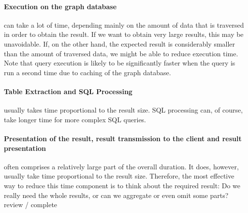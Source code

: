 \paragraph{Execution on the graph database} can take a lot of time, depending mainly on the amount of data that is traversed in order to obtain the result.
If we want to obtain very large results, this may be unavoidable.
If, on the other hand, the expected result is considerably smaller than the amount of traversed data, we might be able to reduce execution time.
Note that query execution is likely to be significantly faster when the query is run a second time due to caching of the graph database.

\paragraph{Table Extraction and SQL Processing} usually takes time proportional to the result size.
SQL processing can, of course, take longer time for more complex SQL queries.

\paragraph{Presentation of the result, result transmission to the client and result presentation} often comprises a relatively large part of the overall duration.
It does, however, usually take time proportional to the result size.
Therefore, the most effective way to reduce this time component is to think about the required result:
Do we really need the whole results, or can we aggregate or even omit some parts?
\todo review / complete

